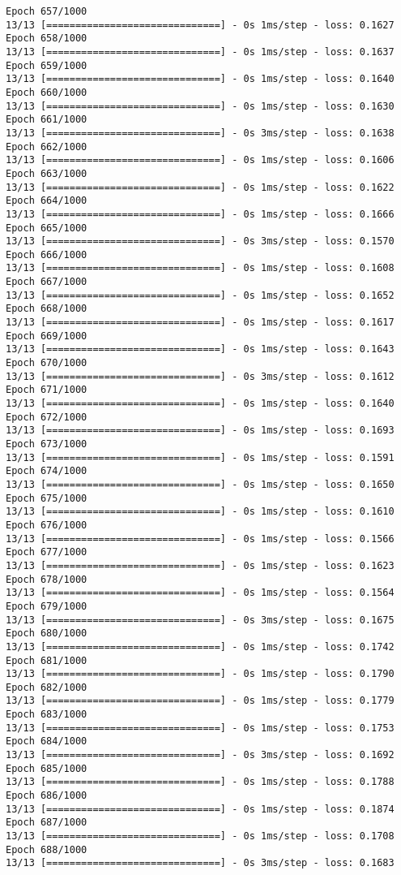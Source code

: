 \documentclass[11pt]{article}
\begin{document}
\begin{Verbatim}[commandchars=\\\{\}]
Epoch 657/1000
13/13 [==============================] - 0s 1ms/step - loss: 0.1627
Epoch 658/1000
13/13 [==============================] - 0s 1ms/step - loss: 0.1637
Epoch 659/1000
13/13 [==============================] - 0s 1ms/step - loss: 0.1640
Epoch 660/1000
13/13 [==============================] - 0s 1ms/step - loss: 0.1630
Epoch 661/1000
13/13 [==============================] - 0s 3ms/step - loss: 0.1638
Epoch 662/1000
13/13 [==============================] - 0s 1ms/step - loss: 0.1606
Epoch 663/1000
13/13 [==============================] - 0s 1ms/step - loss: 0.1622
Epoch 664/1000
13/13 [==============================] - 0s 1ms/step - loss: 0.1666
Epoch 665/1000
13/13 [==============================] - 0s 3ms/step - loss: 0.1570
Epoch 666/1000
13/13 [==============================] - 0s 1ms/step - loss: 0.1608
Epoch 667/1000
13/13 [==============================] - 0s 1ms/step - loss: 0.1652
Epoch 668/1000
13/13 [==============================] - 0s 1ms/step - loss: 0.1617
Epoch 669/1000
13/13 [==============================] - 0s 1ms/step - loss: 0.1643
Epoch 670/1000
13/13 [==============================] - 0s 3ms/step - loss: 0.1612
Epoch 671/1000
13/13 [==============================] - 0s 1ms/step - loss: 0.1640
Epoch 672/1000
13/13 [==============================] - 0s 1ms/step - loss: 0.1693
Epoch 673/1000
13/13 [==============================] - 0s 1ms/step - loss: 0.1591
Epoch 674/1000
13/13 [==============================] - 0s 1ms/step - loss: 0.1650
Epoch 675/1000
13/13 [==============================] - 0s 1ms/step - loss: 0.1610
Epoch 676/1000
13/13 [==============================] - 0s 1ms/step - loss: 0.1566
Epoch 677/1000
13/13 [==============================] - 0s 1ms/step - loss: 0.1623
Epoch 678/1000
13/13 [==============================] - 0s 1ms/step - loss: 0.1564
Epoch 679/1000
13/13 [==============================] - 0s 3ms/step - loss: 0.1675
Epoch 680/1000
13/13 [==============================] - 0s 1ms/step - loss: 0.1742
Epoch 681/1000
13/13 [==============================] - 0s 1ms/step - loss: 0.1790
Epoch 682/1000
13/13 [==============================] - 0s 1ms/step - loss: 0.1779
Epoch 683/1000
13/13 [==============================] - 0s 1ms/step - loss: 0.1753
Epoch 684/1000
13/13 [==============================] - 0s 3ms/step - loss: 0.1692
Epoch 685/1000
13/13 [==============================] - 0s 1ms/step - loss: 0.1788
Epoch 686/1000
13/13 [==============================] - 0s 1ms/step - loss: 0.1874
Epoch 687/1000
13/13 [==============================] - 0s 1ms/step - loss: 0.1708
Epoch 688/1000
13/13 [==============================] - 0s 3ms/step - loss: 0.1683

\end{Verbatim}
\end{document}
